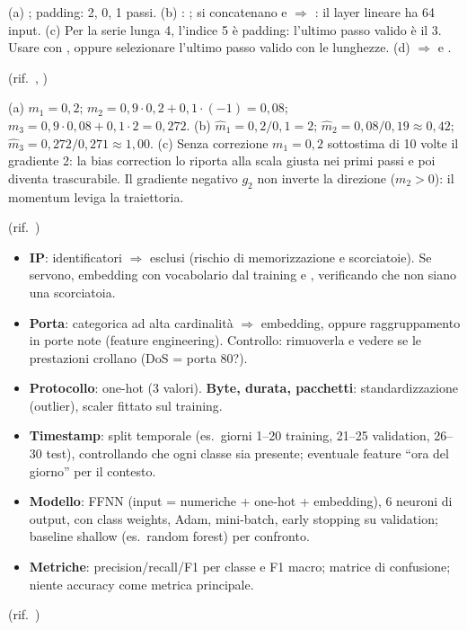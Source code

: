 \begin{soluzione}
(a) ; padding: 2, 0, 1 passi.
(b) : ; si concatenano  e 
$\Rightarrow$ : il layer lineare ha 64 input.
(c) Per la serie lunga 4, l'indice 5 è padding: l'ultimo passo valido è il 3. Usare  con , oppure
selezionare l'ultimo passo valido con le lunghezze.
(d)  $\Rightarrow$  e .

(rif.\ , )
\end{soluzione}

\begin{soluzione}
(a) $m_1 = 0{,}2$; $m_2 = 0{,}9\cdot0{,}2 + 0{,}1\cdot(-1) = 0{,}08$; $m_3 = 0{,}9\cdot0{,}08+0{,}1\cdot2 = 0{,}272$.
(b) $\hat m_1 = 0{,}2/0{,}1 = 2$; $\hat m_2 = 0{,}08/0{,}19 \approx 0{,}42$; $\hat m_3 = 0{,}272/0{,}271 \approx 1{,}00$.
(c) Senza correzione $m_1 = 0{,}2$ sottostima di 10 volte il gradiente 2: la bias correction lo riporta alla scala giusta nei primi passi e
poi diventa trascurabile. Il gradiente negativo $g_2$ non inverte la direzione ($m_2>0$): il momentum leviga la traiettoria.

(rif.\ )
\end{soluzione}

\begin{soluzione}
\begin{itemize}
  \item \textbf{IP}: identificatori $\Rightarrow$ esclusi (rischio di memorizzazione e scorciatoie). Se servono, embedding con vocabolario dal
        training e , verificando che non siano una scorciatoia.
  \item \textbf{Porta}: categorica ad alta cardinalità $\Rightarrow$ embedding, oppure raggruppamento in porte note (feature engineering).
        Controllo: rimuoverla e vedere se le prestazioni crollano (DoS = porta 80?).
  \item \textbf{Protocollo}: one-hot (3 valori). \textbf{Byte, durata, pacchetti}: standardizzazione (outlier), scaler fittato sul training.
  \item \textbf{Timestamp}: split temporale (es.\ giorni 1--20 training, 21--25 validation, 26--30 test), controllando che ogni classe sia
        presente; eventuale feature ``ora del giorno'' per il contesto.
  \item \textbf{Modello}: FFNN (input = numeriche + one-hot + embedding), 6 neuroni di output,  con class weights,
        Adam, mini-batch, early stopping su validation; baseline shallow (es.\ random forest) per confronto.
  \item \textbf{Metriche}: precision/recall/F1 per classe e F1 macro; matrice di confusione; niente accuracy come metrica principale.
\end{itemize}

(rif.\ )
\end{soluzione}


